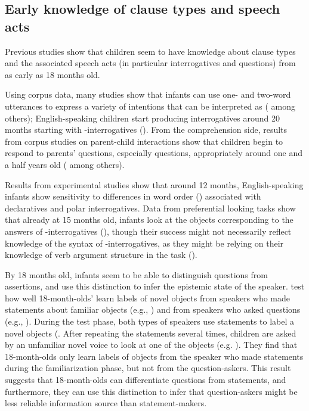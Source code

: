 \subsection{Early knowledge of clause types and speech acts} \label{sec:bg:acq:spcl}

Previous studies show that children seem to have knowledge about clause types and the associated speech acts (in particular interrogatives and questions) from as early as 18 months old. 

Using corpus data, many studies show that infants can use one- and two-word utterances to express a variety of intentions that can be interpreted as \aqrs{} (\cite{bateson1975,bates1976language,ninio1994} among others); English-speaking children start producing interrogatives around 20 months starting with \twh-interrogatives (\citealt{tyack1977, stromswold1995, rowland2003cdswh}). From the comprehension side, results from corpus studies on parent-child interactions show that children begin to respond to parents’ questions, especially  questions, appropriately around one and a half years old (\citealt{ervintripp1978, steffensen1978, shatz1978comprehension, shatz1978communicative, berningergarvey1981, shatzmccloskey1984, clark2015turn, moradlou2020} among others). 





Results from experimental studies show that around 12 months, English-speaking infants show sensitivity to differences in word order (\citealt{geffenmintz2015wordorder}) associated with declaratives and polar interrogatives. Data from preferential looking tasks show that already at 15 months old, infants look at the objects corresponding to the answers of \twh-interrogatives (\citealt{seidl2003wh, gagliardi2016wh, perkins2020filler}), though their success might not necessarily reflect knowledge of the syntax of \twh-interrogatives, as they might be relying on their knowledge of verb argument structure in the task (\citealt{perkins2019}). 

By 18 months old, infants seem to be able to distinguish questions from assertions, and use this distinction to infer the epistemic state of the speaker. \textcite{luchkina2018infant} test how well 18-month-olds’ learn labels of novel objects from speakers who made statements about familiar objects (e.g., ) and from speakers who asked questions (e.g., ). During the test phase, both types of speakers use statements to label a novel objects (. After repeating the statements several times, children are asked by an unfamiliar novel voice to look at one of the objects (e.g. ). They find that 18-month-olds only learn labels of objects from the speaker who made statements during the familiarization phase, but not from the question-askers. This result suggests that 18-month-olds can differentiate questions from statements, and furthermore, they can use this distinction to infer that question-askers might be less reliable information source than statement-makers. 

